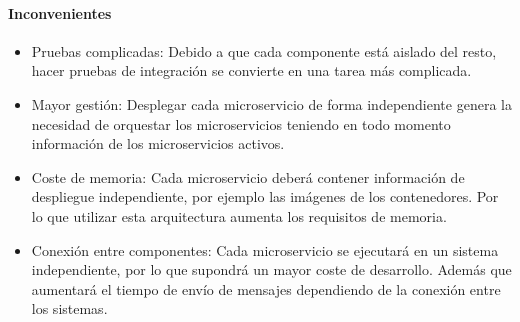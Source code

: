 \documentclass[../main.tex]{subfiles}
\begin{document}
\paragraph{Inconvenientes}
\begin{itemize}
    \item Pruebas complicadas: Debido a que cada componente está aislado del resto, hacer pruebas de integración se convierte en una tarea más complicada.
    \item Mayor gestión: Desplegar cada microservicio de forma independiente genera la necesidad de orquestar los microservicios teniendo en todo momento información de los microservicios activos.
    \item Coste de memoria: Cada microservicio deberá contener información de despliegue independiente, por ejemplo las imágenes de los contenedores. Por lo que utilizar esta arquitectura aumenta los requisitos de memoria.
    \item Conexión entre componentes: Cada microservicio se ejecutará en un sistema independiente, por lo que supondrá un mayor coste de desarrollo. Además que aumentará el tiempo de envío de mensajes dependiendo de la conexión entre los sistemas.
\end{itemize}

\begin{table}[H]
\centering
{}
\caption{Tabla comparativa de arquitectura monolíticas y arquitecturas basadas en microservicios. Fuente: IBM\cite{Currie2015}.}
\label{tab:monolitic-vs-microservice}
\end{table}
\end{document}
